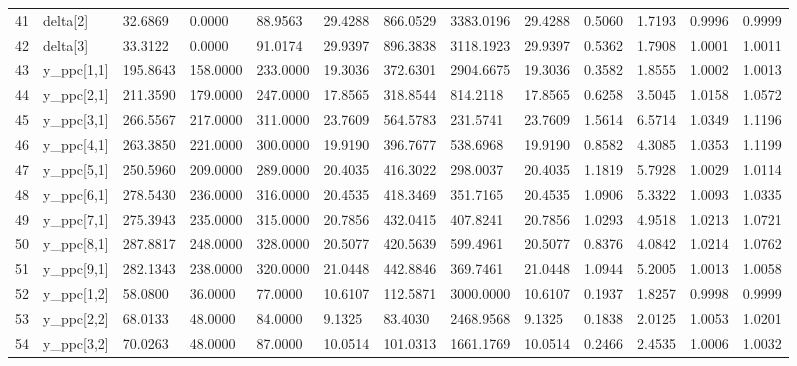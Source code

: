 \begin{table}[ht]
\begin{tabular}{rllllllllllll}
  41 & delta[2] &   32.6869 &    0.0000 &   88.9563 &   29.4288 &     866.0529 & 3383.0196 &   29.4288 &  0.5060 &  1.7193 & 0.9996 & 0.9999 \\ 
  42 & delta[3] &   33.3122 &    0.0000 &   91.0174 &   29.9397 &     896.3838 & 3118.1923 &   29.9397 &  0.5362 &  1.7908 & 1.0001 & 1.0011 \\ 
  43 & y\_ppc[1,1] &  195.8643 &  158.0000 &  233.0000 &   19.3036 &     372.6301 & 2904.6675 &   19.3036 &  0.3582 &  1.8555 & 1.0002 & 1.0013 \\ 
  44 & y\_ppc[2,1] &  211.3590 &  179.0000 &  247.0000 &   17.8565 &     318.8544 &  814.2118 &   17.8565 &  0.6258 &  3.5045 & 1.0158 & 1.0572 \\ 
  45 & y\_ppc[3,1] &  266.5567 &  217.0000 &  311.0000 &   23.7609 &     564.5783 &  231.5741 &   23.7609 &  1.5614 &  6.5714 & 1.0349 & 1.1196 \\ 
  46 & y\_ppc[4,1] &  263.3850 &  221.0000 &  300.0000 &   19.9190 &     396.7677 &  538.6968 &   19.9190 &  0.8582 &  4.3085 & 1.0353 & 1.1199 \\ 
  47 & y\_ppc[5,1] &  250.5960 &  209.0000 &  289.0000 &   20.4035 &     416.3022 &  298.0037 &   20.4035 &  1.1819 &  5.7928 & 1.0029 & 1.0114 \\ 
  48 & y\_ppc[6,1] &  278.5430 &  236.0000 &  316.0000 &   20.4535 &     418.3469 &  351.7165 &   20.4535 &  1.0906 &  5.3322 & 1.0093 & 1.0335 \\ 
  49 & y\_ppc[7,1] &  275.3943 &  235.0000 &  315.0000 &   20.7856 &     432.0415 &  407.8241 &   20.7856 &  1.0293 &  4.9518 & 1.0213 & 1.0721 \\ 
  50 & y\_ppc[8,1] &  287.8817 &  248.0000 &  328.0000 &   20.5077 &     420.5639 &  599.4961 &   20.5077 &  0.8376 &  4.0842 & 1.0214 & 1.0762 \\ 
  51 & y\_ppc[9,1] &  282.1343 &  238.0000 &  320.0000 &   21.0448 &     442.8846 &  369.7461 &   21.0448 &  1.0944 &  5.2005 & 1.0013 & 1.0058 \\ 
  52 & y\_ppc[1,2] &   58.0800 &   36.0000 &   77.0000 &   10.6107 &     112.5871 & 3000.0000 &   10.6107 &  0.1937 &  1.8257 & 0.9998 & 0.9999 \\ 
  53 & y\_ppc[2,2] &   68.0133 &   48.0000 &   84.0000 &    9.1325 &      83.4030 & 2468.9568 &    9.1325 &  0.1838 &  2.0125 & 1.0053 & 1.0201 \\ 
  54 & y\_ppc[3,2] &   70.0263 &   48.0000 &   87.0000 &   10.0514 &     101.0313 & 1661.1769 &   10.0514 &  0.2466 &  2.4535 & 1.0006 & 1.0032 \\ 

\end{tabular}
\end{table}
